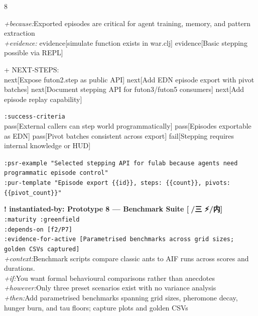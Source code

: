 \documentclass[landscape]{article}
\newcommand{\flexitag}[1]{\textcolor[gray]{0.35}{\textit{#1}}}
\newenvironment{devmapgreenfield}{%
  \def\FrameCommand{\colorbox{devmapgreenfieldbg}}%
  \setlength{\fboxsep}{2pt}%
  \MakeFramed{\advance\hsize-\width \FrameRestore}%
}{\endMakeFramed}
\begin{document}
\begin{paracol}{8}
\begin{devmapgreenfield}
  \flexitag{+because:}Exported episodes are critical for agent training, memory, and pattern extraction\\
  \flexitag{+evidence:} evidence[simulate function exists in war.clj] evidence[Basic stepping possible via REPL]\\
\par
  + NEXT-STEPS:\\
    next[Expose futon2.step as public API] next[Add EDN episode export with pivot batches] next[Document stepping API for futon3/futon5 consumers] next[Add episode replay capability]\\
\par
  \texttt{:\allowbreak{}success-\allowbreak{}criteria}\\
    pass[External callers can step world programmatically] pass[Episodes exportable as EDN] pass[Pivot batches consistent across export] fail[Stepping requires internal knowledge or HUD]\\
\par
  \texttt{:\allowbreak{}psr-\allowbreak{}example "Selected stepping API for fulab because agents need programmatic episode control"}\\
  \texttt{:\allowbreak{}pur-\allowbreak{}template "Episode export \{\{id\}\},\allowbreak{} steps:\allowbreak{} \{\{count\}\},\allowbreak{} pivots:\allowbreak{} \{\{pivot\_\allowbreak{}count\}\}"}\\
\par
\par
\end{devmapgreenfield}
\begin{devmapgreenfield}
\textbf{! instantiated-by: Prototype 8 — Benchmark Suite [🗿/三 ⚡️/内]}\\
  \texttt{:\allowbreak{}maturity :\allowbreak{}greenfield}\\
  \texttt{:\allowbreak{}depends-\allowbreak{}on [f2/\allowbreak{}P7]}\\
  \texttt{:\allowbreak{}evidence-\allowbreak{}for-\allowbreak{}active [Parametrised benchmarks across grid sizes;\allowbreak{} golden CSVs captured]}\\
  \flexitag{+context:}Benchmark scripts compare classic ants to AIF runs across scores and durations.\\
  \flexitag{+if:}You want formal behavioural comparisons rather than anecdotes\\
  \flexitag{+however:}Only three preset scenarios exist with no variance analysis\\
  \flexitag{+then:}Add parametrised benchmarks spanning grid sizes, pheromone decay, hunger burn, and tau floors; capture plots and golden CSVs\\

\end{devmapgreenfield}
\end{paracol}
\end{document}
